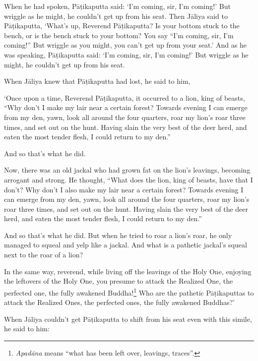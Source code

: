 \documentclass[12pt,openany]{book}%
\begin{document}
When he had spoken, \textsanskrit{Pāṭikaputta} said: ‘I’m coming, sir, I’m coming!’ But wriggle as he might, he couldn’t get up from his seat. Then \textsanskrit{Jāliya} said to \textsanskrit{Pāṭikaputta}, ‘What’s up, Reverend \textsanskrit{Pāṭikaputta}? Is your bottom stuck to the bench, or is the bench stuck to your bottom? You say “I’m coming, sir, I’m coming!” But wriggle as you might, you can’t get up from your seat.’ And as he was speaking, \textsanskrit{Pāṭikaputta} said: ‘I’m coming, sir, I’m coming!’ But wriggle as he might, he couldn’t get up from his seat. 

When \textsanskrit{Jāliya} knew that \textsanskrit{Pāṭikaputta} had lost, he said to him, 

‘Once upon a time, Reverend \textsanskrit{Pāṭikaputta}, it occurred to a lion, king of beasts, “Why don’t I make my lair near a certain forest? Towards evening I can emerge from my den, yawn, look all around the four quarters, roar my lion’s roar three times, and set out on the hunt. Having slain the very best of the deer herd, and eaten the most tender flesh, I could return to my den.” 

And so that’s what he did. 

Now, there was an old jackal who had grown fat on the lion’s leavings, becoming arrogant and strong. He thought, “What does the lion, king of beasts, have that I don’t? Why don’t I also make my lair near a certain forest? Towards evening I can emerge from my den, yawn, look all around the four quarters, roar my lion’s roar three times, and set out on the hunt. Having slain the very best of the deer herd, and eaten the most tender flesh, I could return to my den.” 

And so that’s what he did. But when he tried to roar a lion’s roar, he only managed to squeal and yelp like a jackal. And what is a pathetic jackal’s squeal next to the roar of a lion? 

In the same way, reverend, while living off the leavings of the Holy One, enjoying the leftovers of the Holy One, you presume to attack the Realized One, the perfected one, the fully awakened Buddha!\footnote{\textit{\textsanskrit{Apadāna}} means “what has been left over, leavings, traces”. } Who are the pathetic \textsanskrit{Pāṭikaputtas} to attack the Realized Ones, the perfected ones, the fully awakened Buddhas?’ 

When \textsanskrit{Jāliya} couldn’t get \textsanskrit{Pāṭikaputta} to shift from his seat even with this simile, he said to him: 
\end{document}
